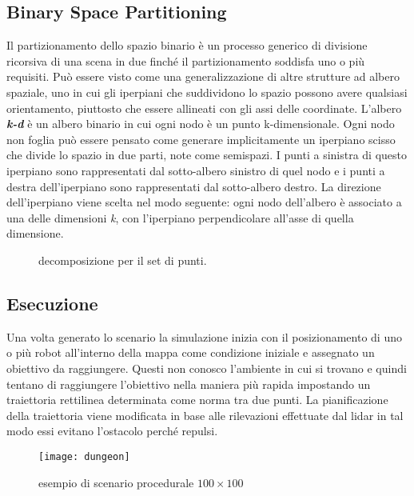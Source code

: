 \subsection{Binary Space Partitioning}
Il partizionamento dello spazio binario è un processo generico di divisione ricorsiva di una scena in due finché il partizionamento soddisfa uno o più requisiti. Può essere visto come una generalizzazione di altre strutture ad albero spaziale, uno in cui gli iperpiani che suddividono lo spazio possono avere qualsiasi orientamento, piuttosto che essere allineati con gli assi delle coordinate.\cite{wiki:bsp}
L'albero \textbf{\emph{k-d}} è un albero binario in cui ogni nodo è un punto k-dimensionale. Ogni nodo non foglia può essere pensato come generare implicitamente un iperpiano scisso che divide lo spazio in due parti, note come semispazi. I punti a sinistra di questo iperpiano sono rappresentati dal sotto-albero sinistro di quel nodo e i punti a destra dell'iperpiano sono rappresentati dal sotto-albero destro. La direzione dell'iperpiano viene scelta nel modo seguente: ogni nodo dell'albero è associato a una delle dimensioni \emph{k}, con l'iperpiano perpendicolare all'asse di quella dimensione.\cite{wiki:kdtree}

\begin{figure}[!htb]
\centering
    \resizebox{0.7\linewidth}{!}{}
\caption{decomposizione per il set di punti.}
\label{fig:decomposizione}
\end{figure}

\subsection{Esecuzione}
Una volta generato lo scenario la simulazione inizia con il posizionamento di uno o più robot all'interno della mappa come condizione iniziale e assegnato un obiettivo da raggiungere.
Questi non conosco l'ambiente in cui si trovano e quindi tentano di raggiungere l'obiettivo nella maniera più rapida impostando un traiettoria rettilinea determinata come norma tra due punti. La pianificazione della traiettoria viene modificata in base alle rilevazioni effettuate dal lidar in tal modo essi evitano l'ostacolo perché repulsi.

\begin{figure}[!htb]
\centering
\texttt{[image: dungeon]}
\caption{esempio di scenario procedurale $100\times100$}
\label{fig:dungeon}
\end{figure}